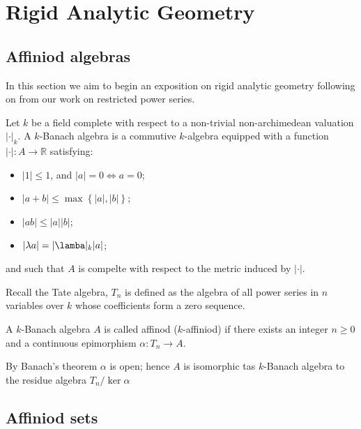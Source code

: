 \chapter{Rigid Analytic Geometry}

\section{Affiniod algebras}

In this section we aim to begin an exposition on rigid analytic geometry following on from our
work on restricted power series.

\begin{definition}
  Let $k$ be a field complete with respect to a non-trivial non-archimedean valuation
  $\lvert \cdot \rvert_k$. A $k$-Banach algebra is a commutive $k$-algebra equipped with a function
  $\lvert \cdot \rvert : A \to \mathbb{R}$ satisfying:
  \begin{itemize}
    \item $\lvert 1 \rvert \leq 1$, and $\lvert a \rvert = 0 \iff a = 0 $;
    \item $\lvert a + b \rvert \leq \max \left\{ \lvert a \rvert, \lvert b \rvert \right\}$;
    \item $\lvert a b \rvert \leq \lvert a \rvert \lvert b \rvert$;
    \item $\lvert \lambda a \rvert = \lvert \lamba \rvert_k \lvert a \rvert$;
  \end{itemize}
  and such that $A$ is compelte with respect to the metric induced by $\lvert \cdot \rvert$.
\end{definition}

Recall the Tate algebra, $T_n$ is defined as the algebra of all power series in $n$ variables over
$k$ whose coefficients form a zero sequence.

\begin{definition}
  A $k$-Banach algebra $A$ is called affinod ($k$-affiniod) if there exists an integer $n \geq 0$
  and a continuous epimorphism $\alpha : T_n \to A$.
\end{definition}

By Banach's theorem %
$\alpha$ is open; hence $A$ is isomorphic tas $k$-Banach algebra to the residue algebra
$T_n / \ker \alpha$

\section{Affiniod sets}


